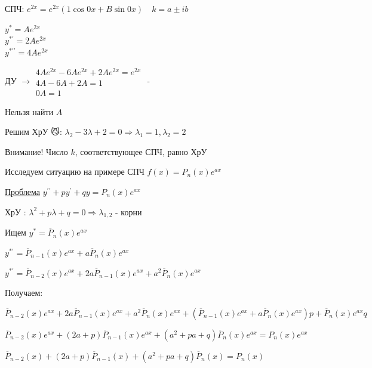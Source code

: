 \documentclass[12pt]{article}
\begin{document}
    СПЧ: $e^{2x} = e^{2x} (1 \cos 0x + B \sin 0x) \quad k = a \pm ib$

    \begin{rcases*}
    $y^* = Ae^{2x}$ \\

    $y^{*\prime} = 2Ae^{2x}$ \\

    $y^{*\prime\prime} = 4Ae^{2x}$ \\
    \end{rcases*} ДУ $\longrightarrow \begin{matrix}4Ae^{2x} - 6Ae^{2x} + 2Ae^{2x} = e^{2x} \\ 4A - 6A + 2A = 1 \\ 0A = 1\end{matrix}$ - {\Huge 🤯}

    Нельзя найти $A$

    Решим ХрУ 😼: $\lambda_2 - 3\lambda + 2 = 0 \Longrightarrow \lambda_1 = 1, \lambda_2 = 2$

    Внимание! Число $k$, соответствующее СПЧ, равно ХрУ \Cat

    \vspace{5mm}

    Исследуем ситуацию на примере СПЧ $f(x) = P_n(x) e^{ax}$

    \underline{Проблема} $y^{\prime\prime} + py^\prime + qy = P_n(x)e^{ax}$

    ХрУ \Cat: $\lambda^2 + p\lambda + q = 0 \Longrightarrow \lambda_{1,2}$ - корни

    \vspace{5mm}
    Ищем $y^* = \overline{P}_n(x) e^{ax}$

    $y^{*\prime} = \overline{P}_{n - 1} (x) e^{ax} + a\overline{P}_n(x) e^{ax}$

    $y^{*\prime} = \overline{P}_{n - 2} (x) e^{ax} + 2a\overline{P}_{n - 1} (x) e^{ax} + a^2\overline{P}_n(x) e^{ax}$

    \vspace{5mm}
    Получаем:

    $\overline{P}_{n - 2} (x) e^{ax} + 2a\overline{P}_{n - 1} (x) e^{ax} + a^2\overline{P}_n(x) e^{ax} + (\overline{P}_{n - 1} (x) e^{ax} + a\overline{P}_n(x) e^{ax})p + \overline{P}_n(x) e^{ax} q $

    $\overline{P}_{n - 2} (x) e^{ax} + (2a + p)\overline{P}_{n - 1} (x) e^{ax} + (a^2 + pa + q)\overline{P}_n(x) e^{ax} = P_n(x) e^{ax}$

    $\overline{P}_{n - 2} (x) + (2a + p)\overline{P}_{n - 1} (x) + (a^2 + pa + q)\overline{P}_n(x) = P_n(x)$
\end{document}
